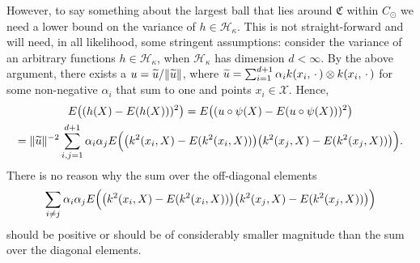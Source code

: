 \documentclass[AHL,Unicode,longabstracts,published]{cedram}
\theoremstyle{remark}
\newcommand{\X}{\mathcal{X}}
\newcommand{\cH}{\mathcal{H}}
\newcommand{\fkC}{\mathfrak{C}}
\let\oldtilde\tilde
\renewcommand*{\tilde}[1]{\mathchoice{\widetilde{#1}}{\widetilde{#1}}{\oldtilde{#1}}{\oldtilde{#1}}}
\begin{document}
However, to say something about the largest ball that lies around $\fkC$ within $C_\odot$ we need a lower bound on the variance of $h \in \cH_\kappa$. This is not straight-forward and will need, in all likelihood, some stringent assumptions: consider the variance of an arbitrary functions $h \in \cH_\kappa$, when $\cH_\kappa$ has dimension $d < \infty$. By the above argument, there exists a $u = \tilde u / \|\tilde u\|$, where $\tilde u = \sum_{i=1}^{d+1} \alpha_i k(x_i,\,\cdot\,) \otimes k(x_i,\,\cdot\,)$ for some non-negative $\alpha_i$ that sum to one and points $x_i \in \X$. Hence,
\begin{multline*}
E\bigl((h(X) - E(h(X)))^2\bigr) = E\bigl((u \circ \psi(X) - E(u \circ \psi(X)))^2\bigr) \\
= \|\tilde u\|^{-2} \sum_{i,j=1}^{d+1} \alpha_i \alpha_j E\Bigl(\bigl(k^2(x_i,X) - E(k^2(x_i,X))\bigr)\bigl(k^2(x_j,X) - E(k^2(x_j,X))\bigr)\Bigr).
\end{multline*}
There is no reason why the sum over the off-diagonal elements
\[
\sum_{i\not =j} \alpha_i \alpha_j E\Bigl(\bigl(k^2(x_i,X) - E(k^2(x_i,X))\bigr)\bigl(k^2(x_j,X) - E(k^2(x_j,X))\bigr)\Bigr)
\]
should be positive or should be of considerably smaller magnitude than the sum over the diagonal elements.
\end{document}
